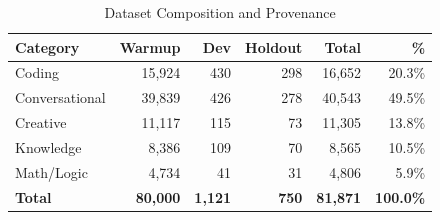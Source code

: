 
\begin{table}[t]
\centering
\caption{Dataset Composition and Provenance}
\label{tab:dataset_composition}
\small
\begin{tabular}{@{}lrrrrr@{}}
\toprule
\textbf{Category} & \textbf{Warmup} & \textbf{Dev} & \textbf{Holdout} & \textbf{Total} & \textbf{\%} \\
\midrule
Coding               & 15,924 &    430 &    298 &  16,652 &  20.3\% \\
Conversational       & 39,839 &    426 &    278 &  40,543 &  49.5\% \\
Creative             & 11,117 &    115 &     73 &  11,305 &  13.8\% \\
Knowledge            &  8,386 &    109 &     70 &   8,565 &  10.5\% \\
Math/Logic           &  4,734 &     41 &     31 &   4,806 &   5.9\% \\
\midrule
\textbf{Total} & \textbf{80,000} & \textbf{1,121} & \textbf{750} & \textbf{81,871} & \textbf{100.0\%} \\
\bottomrule
\end{tabular}


\end{table}
